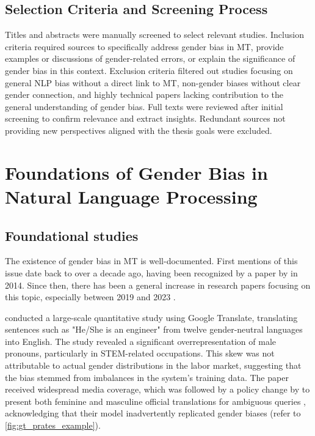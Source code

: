 \subsection{Selection Criteria and Screening Process}
Titles and abstracts were manually screened to select relevant studies. Inclusion criteria required sources to specifically address gender bias in MT, provide examples or discussions of gender-related errors, or explain the significance of gender bias in this context. Exclusion criteria filtered out studies focusing on general NLP bias without a direct link to MT, non-gender biases without clear gender connection, and highly technical papers lacking contribution to the general understanding of gender bias. Full texts were reviewed after initial screening to confirm relevance and extract insights. Redundant sources not providing new perspectives aligned with the thesis goals were excluded.

\section{Foundations of Gender Bias in Natural Language Processing}

\subsection{Foundational studies}
The existence of gender bias in MT is well-documented. First mentions of this issue date back to over a decade ago, having been recognized by a paper by \citeauthor{schiebingerScientificResearchMust2014} in 2014. Since then, there has been a general increase in research papers focusing on this topic, especially between 2019 and 2023 \citep{savoldiDecadeGenderBias2025}.

\citet{pratesAssessingGenderBias2019} conducted a large-scale quantitative study using Google Translate, translating sentences such as "He/She is an engineer" from twelve gender-neutral languages into English. The study revealed a significant overrepresentation of male pronouns, particularly in STEM-related occupations. This skew was not attributable to actual gender distributions in the labor market, suggesting that the bias stemmed from imbalances in the system’s training data. The paper received widespread media coverage, which was followed by a policy change by \citeauthor{googleReducingGenderBias2018} to present both feminine and masculine official translations for ambiguous queries \citep{googleReducingGenderBias2018}, acknowledging that their model inadvertently replicated gender biases (refer to \autoref{fig:gt_prates_example}). 

